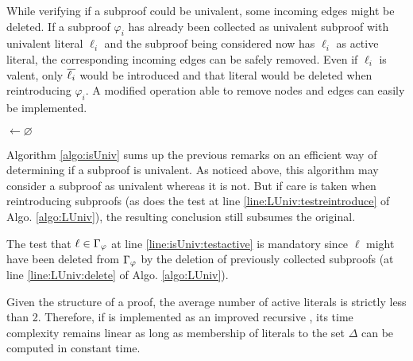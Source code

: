 \documentclass{llncs}
\begin{document}
While verifying if a subproof could be univalent, some incoming edges might be deleted. If a
subproof $\varphi_i$ has already been collected as univalent subproof with univalent literal
$\ell_i$ and the subproof being considered now has $\ell_i$ as active literal, the corresponding
incoming edges can be safely removed. Even if $\ell_i$ is valent, only $\overline{\ell_i}$ would be
introduced and that literal would be deleted when reintroducing $\varphi_i$. A modified
 operation able to remove nodes and edges can easily be implemented.

\begin{algorithm}[bt]
  \BlankLine

  \Activ $\leftarrow \varnothing$ \;
  \BlankLine

  \BlankLine


  \caption[.]{}
  \label{algo:isUniv}
\end{algorithm}

Algorithm \ref{algo:isUniv} sums up the previous remarks on an efficient way of determining if a
subproof is univalent. As noticed above, this algorithm may consider a subproof as univalent whereas
it is not. But if care is taken when reintroducing subproofs (as does the test at line
\ref{line:LUniv:testreintroduce} of Algo. \ref{algo:LUniv}), the resulting conclusion still subsumes
the original.

The test that $\ell \in \Gamma_{\varphi}$ at line \ref{line:isUniv:testactive} is mandatory
since $\ell$ might have been deleted from $\Gamma_{\varphi}$ by the deletion of previously
collected subproofs (at line \ref{line:LUniv:delete} of Algo. \ref{algo:LUniv}).

Given the structure of a proof, the average number of active literals is strictly less than 2.
Therefore, if {\LowerUnivalents} is implemented as an improved recursive , its time
complexity remains linear as long as membership of literals to the set $\Delta$ can be computed in
constant time.
\end{document}
